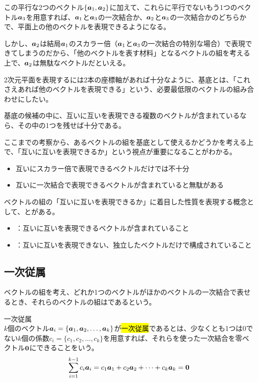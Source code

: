 \documentclass[../imaging-math]{subfiles}
\begin{document}
この平行な2つのベクトル$\{\vb*{a}_1,\vb*{a}_2\}$に加えて、これらに平行でないもう1つのベクトル$\vb*{a}_3$を用意すれば、$\vb*{a}_1$と$\vb*{a}_3$の一次結合か、$\vb*{a}_2$と$\vb*{a}_3$の一次結合かのどちらかで、平面上の他のベクトルを表現できるようになる。

しかし、$\vb*{a}_2$は結局$\vb*{a}_1$のスカラー倍（$\vb*{a}_1$と$\vb*{a}_3$の一次結合の特別な場合）で表現できてしまうのだから、「他のベクトルを表す材料」となるベクトルの組を考える上で、$\vb*{a}_2$は無駄なベクトルだといえる。

\br

2次元平面を表現するには2本の座標軸があれば十分なように、基底とは、「これさえあれば他のベクトルを表現できる」という、必要最低限のベクトルの組み合わせにしたい。

基底の候補の中に、互いに互いを表現できる複数のベクトルが含まれているなら、その中の1つを残せば十分である。

\froufrou

ここまでの考察から、あるベクトルの組を基底として使えるかどうかを考える上で、「互いに互いを表現できるか」という視点が重要になることがわかる。

\begin{itemize}
  \item 互いにスカラー倍で表現できるベクトルだけでは不十分
  \item 互いに一次結合で表現できるベクトルが含まれていると無駄がある
\end{itemize}

ベクトルの組の「互いに互いを表現できるか」に着目した性質を表現する概念として、とがある。

\begin{itemize}
  \item {}：互いに互いを表現できるベクトルが含まれていること
  \item {}：互いに互いを表現できない、独立したベクトルだけで構成されていること
\end{itemize}

\subsection{一次従属}

ベクトルの組を考え、どれか1つのベクトルがほかのベクトルの一次結合で表せるとき、それらのベクトルの組はであるという。

\begin{definition}{一次従属}\quad\\
  $k$個のベクトル$\vb*{a}_i = \{ \vb*{a}_1, \vb*{a}_2, \ldots, \vb*{a}_k \}$が\hl{一次従属}であるとは、少なくとも1つは$0$でない$k$個の係数$c_i = \{c_1, c_2, \ldots, c_k\}$を用意すれば、それらを使った一次結合を零ベクトル$\vb{0}$にできることをいう。
  \large
  \begin{equation*}
    \sum_{i=1}^{k-1} c_i \vb*{a}_i = c_1 \vb*{a}_1 + c_2 \vb*{a}_2 + \cdots + c_k\vb*{a}_{k} = \vb{0}
  \end{equation*}
\end{definition}
\end{document}
